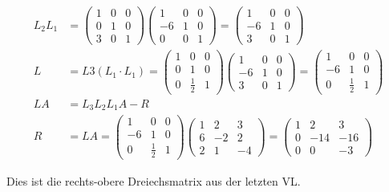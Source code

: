 \documentclass[a4paper,ngerman]{scrbook}
\begin{document}
\begin{align*}
  L_2L_1 &=
  \begin{pmatrix}
    1 & 0 & 0\\
    0 & 1 & 0\\
    3 & 0 & 1
  \end{pmatrix}
  \begin{pmatrix}
    1 & 0 & 0\\
    -6 & 1 & 0\\
    0 & 0 & 1
  \end{pmatrix} =
  \begin{pmatrix}
    1 & 0 & 0\\
    -6 & 1 & 0\\
    3 & 0 & 1
  \end{pmatrix}\\
L &= L3(L_1\cdot L_1) = 
  \begin{pmatrix}
    1 & 0 & 0\\
    0 & 1 & 0\\
    0 & \frac{1}{2} & 1
  \end{pmatrix}
  \begin{pmatrix}
    1 & 0 & 0\\
    -6 & 1 & 0\\
    3 & 0 & 1
  \end{pmatrix} =
  \begin{pmatrix}
    1 & 0 & 0\\
    -6 & 1 & 0\\
    0 & \frac{1}{2} & 1
  \end{pmatrix}\\
  LA &= L_3L_2L_1A - R\\
  R &= LA =
  \begin{pmatrix}
    1 & 0 & 0\\
    -6 & 1 & 0\\
    0 & \frac{1}{2} & 1
  \end{pmatrix}
  \begin{pmatrix}
    1 & 2 & 3\\
    6 & -2 & 2\\
    2 & 1 & -4
  \end{pmatrix} =
  \begin{pmatrix}
    1 & 2 & 3\\
    0 & -14 & -16\\
    0 & 0 & -3
  \end{pmatrix}
\end{align*}

Dies ist die rechts-obere Dreiechsmatrix aus der letzten VL.
\end{document}
